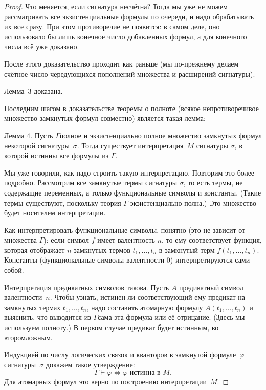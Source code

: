 \begin{proof}
Что меняется, если сигнатура несчётна? Тогда мы уже не можем
рассматривать все экзистенциальные формулы по очереди, и надо
обрабатывать их все сразу. При этом противоречие не появится: в
самом деле, оно использовало бы лишь конечное число добавленных
формул, а для конечного числа всё уже доказано.

После этого доказательство проходит как раньше (мы по-преж\-не\-му
делаем счётное число чередующихся пополнений множества и
расширений сигнатуры).

Лемма~3 доказана.

Последним шагом в доказательстве теоремы о полноте (всякое
непротиворечивое множество замкнутых формул совместно) является
такая лемма:

\textsf{Лемма 4}. Пусть $\Gamma$\т полное и экзистенциально
полное множество замкнутых формул некоторой сигнатуры~$\sigma$.
Тогда существует интерпретация~$M$ сигнатуры $\sigma$, в которой
истинны все формулы из $\Gamma$.

Мы уже говорили, как надо строить такую интерпретацию. Повторим
это более подробно. Рассмотрим все замкнутые термы сигнатуры
$\sigma$, то есть термы, не содержащие переменных, а только
функциональные символы и константы. (Такие термы существуют,
поскольку теория $\Gamma$ экзистенциально полна.) Это множество
будет носителем интерпретации.

Как интерпретировать функциональные символы,
понятно (это не зависит от множества $\Gamma$): если символ $f$
имеет валентность $n$, то ему соответствует функция, которая
отображает $n$ замкнутых термов $t_1,\dots,t_n$ в замкнутый терм
$f(t_1,\dots,t_n)$. Константы (функциональные символы
валентности $0$) интерпретируются сами собой.

Интерпретация предикатных символов такова. Пусть $A$\т
предикатный символ валентности~$n$. Чтобы узнать, истинен ли
соответствующий ему предикат на замкнутых термах
$t_1,\dots,t_n$, надо составить атомарную формулу
$A(t_1,\dots,t_n)$ и выяснить, что выводится из $\Gamma$\т сама
эта формула или её отрицание. (Здесь мы используем полноту.) В
первом случае предикат будет истинным, во втором\т ложным.

Индукцией по числу логических связок и кванторов в замкнутой
формуле~$\varphi$ сигнатуры~$\sigma$ докажем такое утверждение:
        $$
\Gamma\vdash\varphi\Leftrightarrow \text{$\varphi$ истинна в $M$.}
        $$
Для атомарных формул это верно по построению интерпретации~$M$.


\end{proof}
